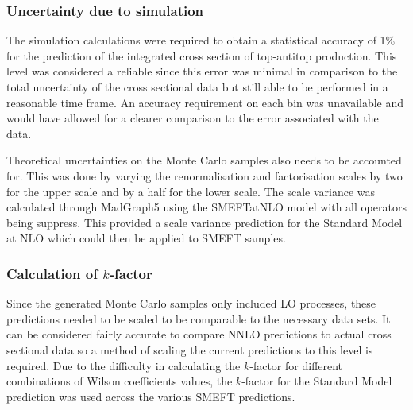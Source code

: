 \documentclass[a4paper,11pt]{article}
\begin{document}
\subsubsection{Uncertainty due to simulation}\label{sec:scale_variance}

The simulation calculations were required to obtain a statistical accuracy of 1\% for the prediction of the integrated cross section of top-antitop production.
This level was considered a reliable since this error was minimal in comparison to the total uncertainty of the cross sectional data but still able to be performed in a reasonable time frame.
An accuracy requirement on each bin was unavailable and would have allowed for a clearer comparison to the error associated with the data.

Theoretical uncertainties on the Monte Carlo samples also needs to be accounted for.
This was done by varying the renormalisation and factorisation scales by two for the upper scale and by a half for the lower scale.
The scale variance was calculated through MadGraph5 using the SMEFTatNLO model with all operators being suppress.
This provided a scale variance prediction for the Standard Model at NLO which could then be applied to SMEFT samples.

\subsubsection{Calculation of \texorpdfstring{$k$}{k}-factor}
Since the generated Monte Carlo samples only included LO processes, these predictions needed to be scaled to be comparable to the necessary data sets.
It can be considered fairly accurate to compare NNLO predictions to actual cross sectional data so a method of scaling the current predictions to this level is required.
Due to the difficulty in calculating the $k$-factor for different combinations of Wilson coefficients values, the $k$-factor for the Standard Model prediction was used across the various SMEFT predictions.
\end{document}
